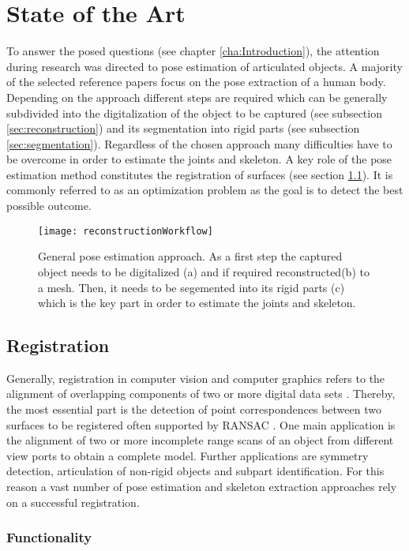 \chapter{State of the Art}
\label{cha:StateOfTheArt}

To answer the posed questions (see chapter \ref{cha:Introduction}), the attention during research was directed to pose estimation of articulated objects. A majority of the selected reference papers focus on the pose extraction of a human body. Depending on the approach different steps are required which can be generally subdivided into the digitalization of the object to be captured (see subsection \ref{sec:reconstruction}) and its segmentation into rigid parts (see subsection \ref{sec:segmentation}). Regardless of the chosen approach many difficulties have to be overcome in order to estimate the joints and skeleton. A key role of the pose estimation method constitutes the registration of surfaces (see section \ref{registration}). It is commonly referred to as an optimization problem as the goal is to detect the best possible outcome.
%
\begin{figure}[H]
	\centering
	\texttt{[image: reconstructionWorkflow]}
	\caption{General pose estimation approach. As a first step the captured object needs to be digitalized (a) and if required reconstructed(b) to a mesh. Then, it needs to be segemented into its rigid parts (c) which is the key part in order to estimate the joints and skeleton.}
	\label{fig:posecapture}
\end{figure}
%
%
\section{Registration}
\label{registration}
Generally, registration in computer vision and computer graphics refers to the alignment of overlapping components of two or more digital data sets \cite{survey}. Thereby, the most essential part is the detection of point correspondences between two surfaces to be registered often supported by RANSAC \cite{ransac}. One main application is the alignment of two or more incomplete range scans of an object from different view ports to obtain a complete model. Further applications are symmetry detection, articulation of non-rigid objects and subpart identification. For this reason a vast number of pose estimation and skeleton extraction approaches rely on a successful registration. 

\subsection{Functionality}

